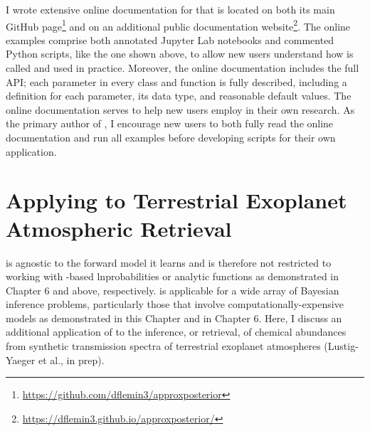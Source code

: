 I wrote extensive online documentation for \approxposterior that is located on both its main GitHub page\footnote{\href{https://github.com/dflemin3/approxposterior}{https://github.com/dflemin3/approxposterior}} and on an additional public documentation website\footnote{\href{https://dflemin3.github.io/approxposterior/}{https://dflemin3.github.io/approxposterior/}}. The online examples comprise both annotated Jupyter Lab notebooks and commented Python scripts, like the one shown above, to allow new users understand how \approxposterior is called and used in practice. Moreover, the online documentation includes the full \approxposterior API; each parameter in every \approxposterior class and function is fully described, including a definition for each parameter, its data type, and reasonable default values. The online documentation serves to help new users employ \approxposterior in their own research. As the primary author of \approxposterior, I encourage new users to both fully read the online documentation and run all examples before developing scripts for their own application.

\section{Applying \approxposterior to Terrestrial Exoplanet Atmospheric Retrieval} \label{AP:sec:future}

\approxposterior is agnostic to the forward model it learns and is therefore not restricted to working with \vplanet-based lnprobabilities or analytic functions as demonstrated in Chapter 6 and above, respectively. \approxposterior is applicable for a wide array of Bayesian inference problems, particularly those that involve computationally-expensive models as demonstrated in this Chapter and in Chapter 6.  Here, I discuss an additional application of \approxposterior to the inference, or retrieval, of chemical abundances from synthetic transmission spectra of terrestrial exoplanet atmospheres (Lustig-Yaeger et al., in prep).

